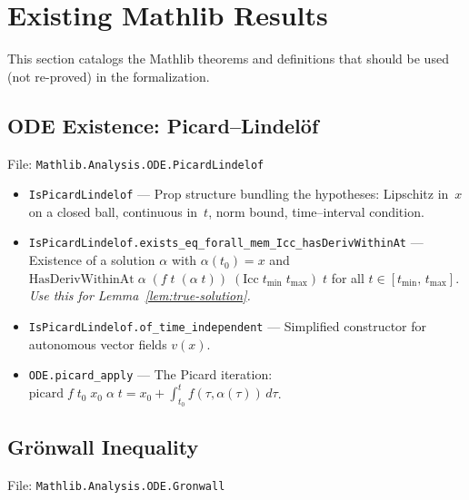 \documentclass[11pt,a4paper]{article}
\theoremstyle{definition}
\newcommand{\Icc}[2]{[#1,\, #2]}
\begin{document}
\section{Existing Mathlib Results}\label{sec:mathlib}

This section catalogs the Mathlib theorems and definitions that
should be used (not re-proved) in the formalization.

\subsection{ODE Existence: Picard--Lindel\"of}
\label{ssec:picard}

File: \texttt{Mathlib.Analysis.ODE.PicardLindelof}

\begin{itemize}
  \item \texttt{IsPicardLindelof} --- Prop structure bundling the
    hypotheses: Lipschitz in~$x$ on a closed ball, continuous in~$t$,
    norm bound, time--interval condition.

  \item \texttt{IsPicardLindelof.exists\_eq\_forall\_mem\_Icc\_hasDerivWithinAt}
    --- Existence of a solution $\alpha$ with $\alpha(t_0) = x$ and
    $\mathrm{HasDerivWithinAt}\;\alpha\;(f\;t\;(\alpha\;t))\;
    (\mathrm{Icc}\;t_{\min}\;t_{\max})\;t$
    for all $t \in \Icc{t_{\min}}{t_{\max}}$.
    \emph{Use this for Lemma~\ref{lem:true-solution}.}

  \item \texttt{IsPicardLindelof.of\_time\_independent} ---
    Simplified constructor for autonomous vector fields $v(x)$.

  \item \texttt{ODE.picard\_apply} ---
    The Picard iteration: $\mathrm{picard}\;f\;t_0\;x_0\;\alpha\;t
    = x_0 + \int_{t_0}^{t} f(\tau, \alpha(\tau))\,d\tau$.
\end{itemize}


\subsection{Gr\"onwall Inequality}
\label{ssec:gronwall}

File: \texttt{Mathlib.Analysis.ODE.Gronwall}
\end{document}
